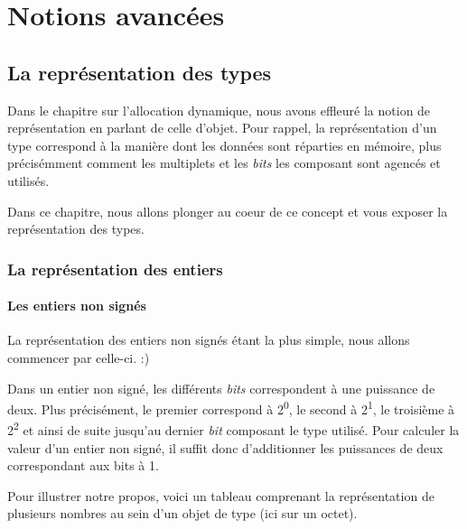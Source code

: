 \part{Notions avancées}
\label{notions-avancees}

\chapter{La représentation des types }
\label{la-representation-des-types }

Dans le chapitre sur l'allocation
  dynamique, nous avons effleuré la notion de représentation en parlant
  de celle d'objet. Pour rappel, la représentation d'un type correspond
  à la manière dont les données sont réparties en mémoire, plus
  précisémment comment les multiplets et les \emph{bits} les composant
  sont agencés et utilisés.
  
  Dans ce chapitre, nous allons plonger au coeur de ce concept et vous
exposer la représentation des types.
  
\section{La représentation des entiers}
\label{la-representation-des-entiers}

\subsection{Les entiers non signés}
\label{les-entiers-non-signes-1}

La représentation des entiers non signés étant la plus simple, nous
allons commencer par celle-ci. :)

Dans un entier non signé, les différents \emph{bits} correspondent à une
puissance de deux. Plus précisément, le premier correspond à
2\textsuperscript{0}, le second à 2\textsuperscript{1}, le troisième à
2\textsuperscript{2} et ainsi de suite jusqu'au dernier \emph{bit}
composant le type utilisé. Pour calculer la valeur d'un entier non
signé, il suffit donc d'additionner les puissances de deux correspondant
aux bits à 1.

Pour illustrer notre propos, voici un tableau comprenant la
représentation de plusieurs nombres au sein d'un objet de type
 (ici sur un octet).

